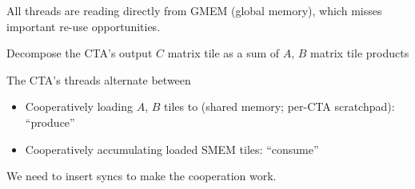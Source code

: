 \newpage
{}


\newpage
{}



\newpage
{}



\newpage
{}

All threads are reading directly from GMEM (global memory), which misses important re-use opportunities.



\newpage
{}

Decompose the CTA's output $C$ matrix tile as a sum of $A$, $B$ matrix tile products

The CTA's threads alternate between
\begin{itemize}
  \item Cooperatively loading $A$, $B$ tiles to  (shared memory; per-CTA scratchpad): ``produce''
  \item Cooperatively accumulating loaded SMEM tiles: ``consume''
\end{itemize}
We need to insert syncs to make the cooperation work.

